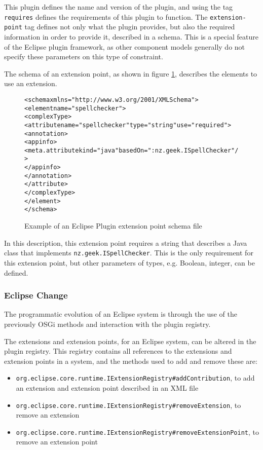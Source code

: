 This plugin defines the name and version of the plugin, and using the tag \texttt{requires} defines the requirements of this plugin to function.
The \texttt{extension-point} tag defines not only what the plugin provides, but also the required information in order to provide it, described in a schema.
This is a special feature of the Eclipse plugin framework, as other component models generally do not specify these parameters on this type of constraint. 

The schema of an extension point, as shown in figure \ref{eclipseextensionschema}, describes the elements to use an extension.

\begin{figure}[htp]
\begin{center}
\begin{framed}
\begin{alltt}
<schema xmlns="http://www.w3.org/2001/XMLSchema">
 <element name="spellchecker">
  <complexType>
   <attribute name="spellchecker" type="string" use="required">
    <annotation>
     <appinfo>
      <meta.attribute kind="java" basedOn=":nz.geek.ISpellChecker"/>
     </appinfo>
    </annotation>
   </attribute>
  </complexType>
 </element>
</schema>
\end{alltt}
\end{framed}
  \caption{Example of an Eclipse Plugin extension point schema file}
  \label{eclipseextensionschema}
\end{center}
\end{figure}

In this description, this extension point requires a string that describes a Java class that implements \texttt{nz.geek.ISpellChecker}.
This is the only requirement for this extension point, but other parameters of types, e.g. Boolean, integer, can be defined.

\subsubsection{Eclipse Change}
The programmatic evolution of an Eclipse system is through the use of the previously OSGi methods and interaction with the plugin registry.

The extensions and extension points, for an Eclipse system, can be altered in the plugin registry.
This registry contains all references to the extensions and extension points in a system,
and the methods used to add and remove these are:

\begin{itemize}
  \item \texttt{org.eclipse.core.runtime.IExtensionRegistry}\verb+#+\texttt{addContribution}, to add an extension and extension point described in an XML file
  \item \texttt{org.eclipse.core.runtime.IExtensionRegistry}\verb+#+\texttt{removeExtension}, to remove an extension
  \item \texttt{org.eclipse.core.runtime.IExtensionRegistry}\verb+#+\texttt{removeExtensionPoint}, to remove an extension point
\end{itemize}


